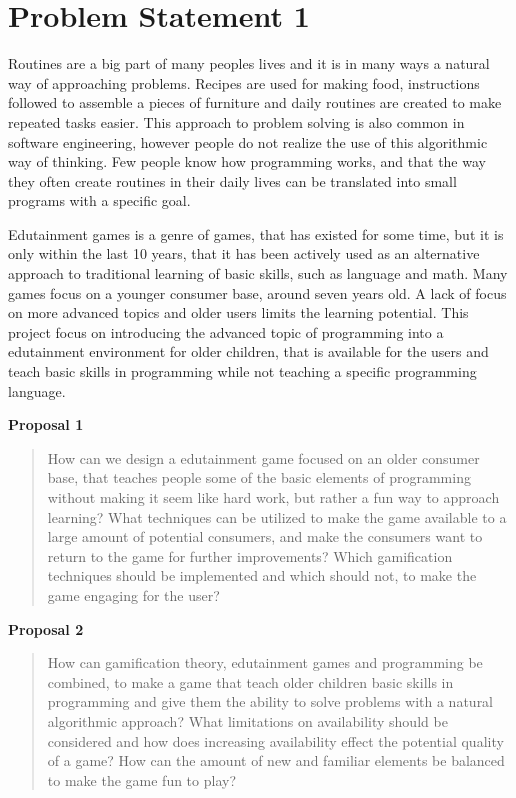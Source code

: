 \section{Problem Statement 1}
\label{sec:problemstatement1}

Routines are a big part of many peoples lives and it is in many ways a natural way of approaching problems. Recipes are used for making food, instructions followed to assemble a pieces of furniture and daily routines are created to make repeated tasks easier. This approach to problem solving is also common in software engineering, however people do not realize the use of this algorithmic way of thinking. Few people know how programming works, and that the way they often create routines in their daily lives can be translated into small programs with a specific goal.

Edutainment games is a genre of games, that has existed for some time, but it is only within the last 10 years, that it has been actively used as an alternative approach to traditional learning of basic skills, such as language and math. Many games focus on a younger consumer base, around seven years old. A lack of focus on more advanced topics and older users limits the learning potential. This project focus on introducing the advanced topic of programming into a edutainment environment for older children, that is available for the users and teach basic skills in programming while not teaching a specific programming language.

\textbf{Proposal 1}
\begin{quotation}
	How can we design a edutainment game focused on an older consumer base, that teaches people some of the basic elements of programming without making it seem like hard work, but rather a fun way to approach learning? What techniques can be utilized to make the game available to a large amount of potential consumers, and make the consumers want to return to the game for further improvements? Which gamification techniques should be implemented and which should not, to make the game engaging for the user?
\end{quotation}

\textbf{Proposal 2}
\begin{quotation}
	How can gamification theory, edutainment games and programming be combined, to make a game that teach older children basic skills in programming and give them the ability to solve problems with a natural algorithmic approach? What limitations on availability should be considered and how does increasing availability effect the potential quality of a game? How can the amount of new and familiar elements be balanced to make the game fun to play?
\end{quotation}

